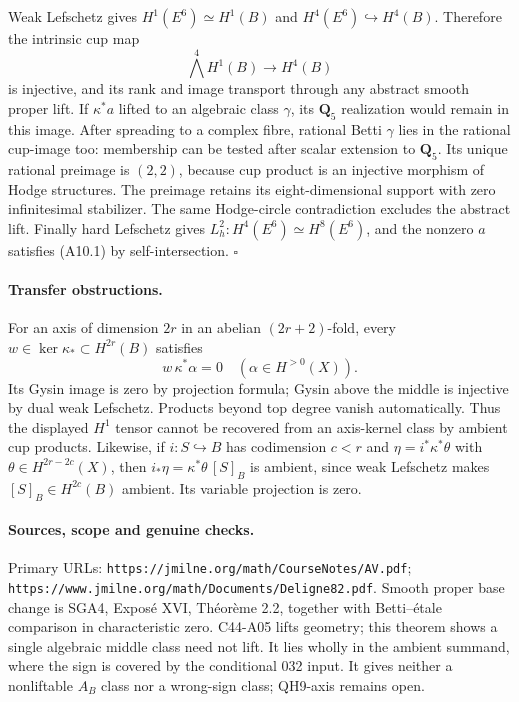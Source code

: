 \documentclass[11pt]{article}
\theoremstyle{remark}\newtheorem{remark}[theorem]{Remark}
\begin{document}
Weak Lefschetz gives $H^1(E^6)\simeq H^1(B)$ and
$H^4(E^6)\hookrightarrow H^4(B)$. Therefore the intrinsic cup map
\[
                     \bigwedge^4H^1(B)\longrightarrow H^4(B)
\]
is injective, and its rank and image transport through any abstract
smooth proper lift. If $\kappa^*a$ lifted to an algebraic class
$\gamma$, its $\mathbf Q_5$ realization would remain in this image.
After spreading to a complex fibre, rational Betti $\gamma$ lies
in the rational cup-image too: membership can be tested after
scalar extension to $\mathbf Q_5$.
Its unique rational preimage is $(2,2)$, because cup product is
an injective morphism of Hodge structures. The preimage retains
its eight-dimensional support with zero infinitesimal stabilizer.
The same Hodge-circle contradiction excludes the abstract lift.
Finally hard Lefschetz gives
$L_h^2:H^4(E^6)\simeq H^8(E^6)$, and the nonzero $a$ satisfies
(A10.1) by self-intersection. \hfill$\square$

\paragraph{Transfer obstructions.}
For an axis of dimension $2r$ in an abelian $(2r+2)$-fold,
every $w\in\ker\kappa_*\subset H^{2r}(B)$ satisfies
\[
                   w\,\kappa^*\alpha=0\quad
                         (\alpha\in H^{>0}(X)).
\]
Its Gysin image is zero by projection formula; Gysin above the
middle is injective by dual weak Lefschetz. Products beyond top
degree vanish automatically. Thus the displayed $H^1$ tensor
cannot be recovered from an axis-kernel class by ambient cup
products.
Likewise, if $i:S\hookrightarrow B$ has codimension $c<r$ and
$\eta=i^*\kappa^*\theta$ with $\theta\in H^{2r-2c}(X)$, then
$i_*\eta=\kappa^*\theta\,[S]_B$ is ambient, since weak Lefschetz
makes $[S]_B\in H^{2c}(B)$ ambient. Its variable projection is zero.

\paragraph{Sources, scope and genuine checks.}
Primary URLs:
\texttt{https://jmilne.org/math/CourseNotes/AV.pdf};
\texttt{https://www.jmilne.org/math/Documents/Deligne82.pdf}.
Smooth proper base change is SGA4, Expos\'e XVI, Th\'eor\`eme 2.2,
together with Betti--\'etale comparison in characteristic zero.
C44-A05 lifts geometry; this theorem shows a single algebraic
middle class need not lift. It lies wholly in the ambient summand,
where the sign is covered by the conditional 032 input.
It gives neither a nonliftable $A_B$ class nor a wrong-sign class;
QH9-axis remains open.
\end{document}
